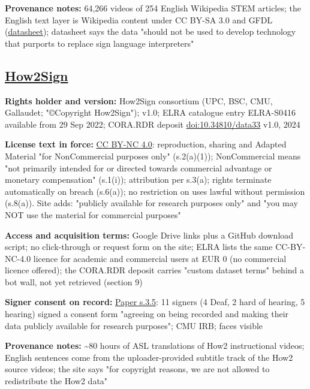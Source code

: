 \documentclass[10pt,a4paper]{article}
\begin{document}
\textbf{Provenance notes:} 64,266 videos of 254 English Wikipedia STEM
articles; the English text layer is Wikipedia content under CC BY-SA 3.0
and GFDL
(\href{https://www.microsoft.com/en-us/research/project/asl-stem-wiki/datasheet/}{datasheet});
datasheet says the data "should not be used to develop technology that
purports to replace sign language interpreters"

\subsection{\texorpdfstring{\href{https://how2sign.github.io/}{How2Sign}}{How2Sign}}\label{how2sign}

\textbf{Rights holder and version:} How2Sign consortium (UPC, BSC, CMU,
Gallaudet; "©Copyright How2Sign"); v1.0; ELRA catalogue entry ELRA-S0416
available from 29 Sep 2022; CORA.RDR deposit
\href{https://b2find.eudat.eu/dataset/99ba11b8-9428-5177-9e25-ccccc296e061}{doi:10.34810/data33}
v1.0, 2024

\textbf{License text in force:}
\href{https://creativecommons.org/licenses/by-nc/4.0/}{CC BY-NC 4.0}:
reproduction, sharing and Adapted Material "for NonCommercial purposes
only" (s.2(a)(1)); NonCommercial means "not primarily intended for or
directed towards commercial advantage or monetary compensation"
(s.1(i)); attribution per s.3(a); rights terminate automatically on
breach (s.6(a)); no restriction on uses lawful without permission
(s.8(a)). Site adds: "publicly available for research purposes only" and
"you may NOT use the material for commercial purposes"

\textbf{Access and acquisition terms:} Google Drive links plus a GitHub
download script; no click-through or request form on the site; ELRA
lists the same CC-BY-NC-4.0 licence for academic and commercial users at
EUR 0 (no commercial licence offered); the CORA.RDR deposit carries
"custom dataset terms" behind a bot wall, not yet retrieved (section 9)

\textbf{Signer consent on record:}
\href{https://arxiv.org/pdf/2008.08143v2}{Paper s.3.5}: 11 signers (4
Deaf, 2 hard of hearing, 5 hearing) signed a consent form "agreeing on
being recorded and making their data publicly available for research
purposes"; CMU IRB; faces visible

\textbf{Provenance notes:} \textasciitilde80 hours of ASL translations
of How2 instructional videos; English sentences come from the
uploader-provided subtitle track of the How2 source videos; the site
says "for copyright reasons, we are not allowed to redistribute the How2
data"
\end{document}
